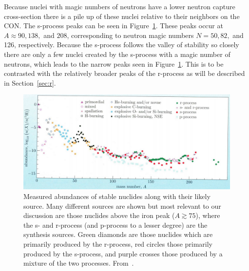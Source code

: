 Because nuclei with magic numbers of neutrons have a lower neutron
capture cross-section there is a pile up of these nuclei relative to
their neighbors on the CON.  The s-process peaks can be seen in
Figure~\ref{fig:peaks}. These peaks occur at $A\approx 90, 138, $ and $208$,
corresponding to neutron magic numbers $N=50, 82, $ and 126, respectively.
Because the s-process follows the valley of
stability so closely there are only a few nuclei created by the
s-process with a magic number of neutrons, which leads to the narrow
peaks seen in Figure~\ref{fig:peaks}.  This is to be contrasted with the
relatively broader peaks of the r-process as will be described in
Section~\ref{sec:r}. 

\begin{figure}
\centering
\includegraphics[width=6in]{pdf/peaks.png}
\caption{\label{fig:peaks} Measured abundances of stable nuclides
 along with their likely source.  Many different sources are shown but
 most relevant to our discussion are those nuclides above the iron
 peak
 ($A\gtrsim75$),
 where the s- and r-process (and p-process to a lesser degree) are the
 synthesis sources.  Green diamonds are those nuclides which are
 primarily produced by the r-process, red circles those primarily
 produced by the s-process, and purple crosses those produced by a
 mixture of the two processes.  From~\cite{ryan2010}.}
\end{figure}

